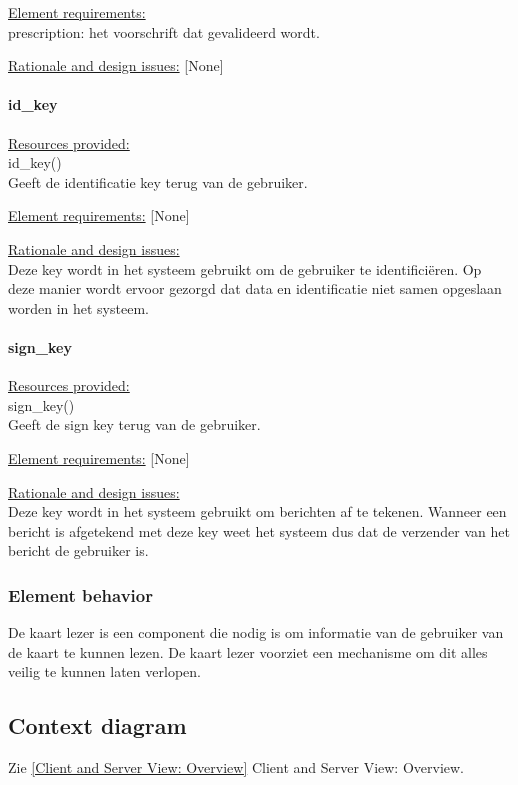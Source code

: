 \documentclass[a4paper,10pt]{article}
\begin{document}
\underline{Element requirements:}\\
prescription: het voorschrift dat gevalideerd wordt.

\underline{Rationale and design issues:} [None]

\paragraph{id\_key}

\underline{Resources provided:}\\
id\_key()\\
Geeft de identificatie key terug van de gebruiker.

\underline{Element requirements:} [None]

\underline{Rationale and design issues:}\\
Deze key wordt in het systeem gebruikt om de gebruiker te identifici\"{e}ren.  Op deze manier wordt ervoor gezorgd dat data en identificatie niet samen opgeslaan worden in het systeem.

\paragraph{sign\_key}

\underline{Resources provided:}\\
sign\_key()\\
Geeft de sign key terug van de gebruiker.

\underline{Element requirements:} [None]

\underline{Rationale and design issues:}\\
Deze key wordt in het systeem gebruikt om berichten af te tekenen.  Wanneer een bericht is afgetekend met deze key weet het systeem dus dat de verzender van het bericht de gebruiker is.

\subsubsection{Element behavior}
De kaart lezer is een component die nodig is om informatie van de gebruiker van de kaart te kunnen lezen.  De kaart lezer voorziet een mechanisme om dit alles veilig te kunnen laten verlopen.

\subsection{Context diagram}
Zie \ref{Client and Server View: Overview} Client and Server View: Overview.
\end{document}
